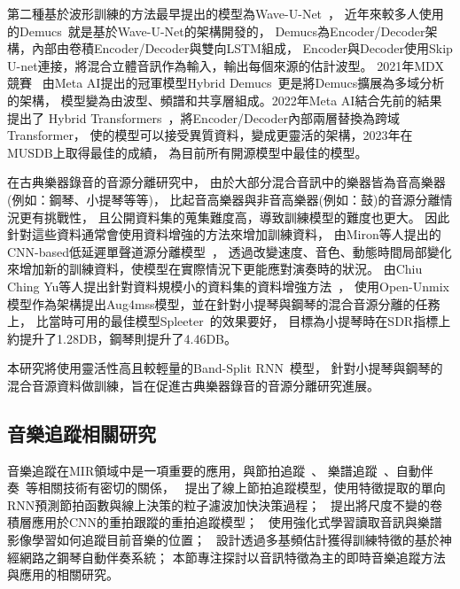 \documentclass[class=NCU_thesis, crop=false]{standalone}
\begin{document}
第二種基於波形訓練的方法最早提出的模型為Wave-U-Net~\cite{stoller2018wave}，
近年來較多人使用的Demucs~\cite{défossez2021music}就是基於Wave-U-Net的架構開發的，
Demucs為Encoder/Decoder架構，內部由卷積Encoder/Decoder與雙向LSTM組成，
Encoder與Decoder使用Skip U-net連接，將混合立體音訊作為輸入，輸出每個來源的估計波型。
2021年MDX競賽~\cite{Yuki_Mitsufuji2021MusicDemixing}
由Meta AI提出的冠軍模型Hybrid Demucs~\cite{defossez2021hybrid}更是將Demucs擴展為多域分析的架構，
模型變為由波型、頻譜和共享層組成。2022年Meta AI結合先前的結果提出了
Hybrid Transformers~\cite{rouard2023hybrid}，將Encoder/Decoder內部兩層替換為跨域Transformer，
使的模型可以接受異質資料，變成更靈活的架構，2023年在MUSDB上取得最佳的成績，
為目前所有開源模型中最佳的模型。

在古典樂器錄音的音源分離研究中，
由於大部分混合音訊中的樂器皆為音高樂器(例如：鋼琴、小提琴等等)，
比起音高樂器與非音高樂器(例如：鼓)的音源分離情況更有挑戰性，
且公開資料集的蒐集難度高，導致訓練模型的難度也更大。
因此針對這些資料通常會使用資料增強的方法來增加訓練資料，
由Miron等人提出的CNN-based低延遲單聲道源分離模型~\cite{miron2017generating}，
透過改變速度、音色、動態時間局部變化來增加新的訓練資料，使模型在實際情況下更能應對演奏時的狀況。
由Chiu Ching Yu等人提出針對資料規模小的資料集的資料增強方法~\cite{Chiu_ChingYu2020MixingSpecific}，
使用Open-Unmix模型作為架構提出Aug4mss模型，並在針對小提琴與鋼琴的混合音源分離的任務上，
比當時可用的最佳模型Spleeter~\cite{hennequin2020spleeter}的效果要好，
目標為小提琴時在SDR指標上約提升了1.28DB，鋼琴則提升了4.46DB。

本研究將使用靈活性高且較輕量的Band-Split RNN~\cite{Luo_Yi2022MusicSourceSeparation}模型，
針對小提琴與鋼琴的混合音源資料做訓練，旨在促進古典樂器錄音的音源分離研究進展。

\subsection{音樂追蹤相關研究}
音樂追蹤在MIR領域中是一項重要的應用，與節拍追蹤~\cite{heydari2021don, di2021downbeat}、
樂譜追蹤~\cite{henkel2019score}、自動伴奏~\cite{zhang2023design}等相關技術有密切的關係，
~\cite{heydari2021don}提出了線上節拍追蹤模型，使用特徵提取的單向RNN預測節拍函數與線上決策的粒子濾波加快決策過程；
~\cite{di2021downbeat}提出將尺度不變的卷積層應用於CNN的重拍跟蹤的重拍追蹤模型；
~\cite{henkel2019score}使用強化式學習讀取音訊與樂譜影像學習如何追蹤目前音樂的位置；
~\cite{zhang2023design}設計透過多基頻估計獲得訓練特徵的基於神經網路之鋼琴自動伴奏系統；
本節專注探討以音訊特徵為主的即時音樂追蹤方法與應用的相關研究。
\end{document}
